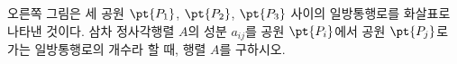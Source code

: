 \noindent\begin{minipage}[t]{0.58\linewidth}\vspace{0pt}\raggedright 오른쪽 그림은 세 공원 $\pt{P_1}$, $\pt{P_2}$, $\pt{P_3}$ 사이의 일방통행로를 화살표로 나타낸 것이다. 삼차 정사각행렬 $A$의 성분 $a_{ij}$를 공원 $\pt{P_i}$에서 공원 $\pt{P_j}$로 가는 일방통행로의 개수라 할 때, 행렬 $A$를 구하시오.\end{minipage}\hfill\begin{minipage}[t]{0.4\linewidth}\vspace{0pt}\centering \resizebox{\ifdim\width>\linewidth\linewidth\else\width\fi}{!}{}\end{minipage}\par
